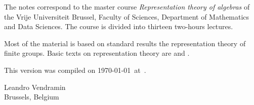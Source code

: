 \preface

The notes correspond to the master  
course \emph{Representation theory of algebras} of the 
Vrije Universiteit Brussel, 
Faculty of Sciences, 
Department of Mathematics and Data Sciences. The course
is divided into thirteen two-hours lectures. 

Most of the material is based on standard 
results the representation theory of finite groups. 
Basic texts on representation theory are \cite{MR1369573} 
and \cite{MR2270898}. 


This version 
was compiled on \today~at~\currenttime.

\bigskip
\begin{flushright}
Leandro Vendramin\\Brussels, Belgium\par
\end{flushright}
